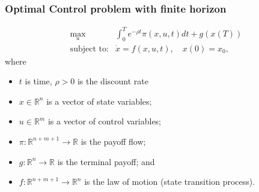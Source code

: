 \documentclass[bigger,handout]{beamer}
\newenvironment{stepitemize}{\begin{itemize}[<+->]}{\end{itemize} }
\begin{document}
 
 
\begin{frame}%
 
\frametitle{Optimal Control problem with finite horizon}

\begin{equation*}
\begin{array}{rc}
\max_{u} & \int_{0}^{T}e^{-\rho t}\pi (x,u,t)dt+g(x(T)) \\ 
\text{subject to:} & \dot{x}=f(x,u,t),\quad x(0)=x_{0},%
\end{array}%
\end{equation*}%
where

\begin{stepitemize}
\item $t$ is time, $\rho >0$ is the discount rate

\item $x\in \mathbb{R}^{n}$ is a vector of state variables;

\item $u\in \mathbb{R}^{m}$ is a vector of control variables;

\item $\pi :\mathbb{R}^{n+m+1}\rightarrow \mathbb{R}$ is the payoff flow;

\item $g:\mathbb{R}^{n}\rightarrow \mathbb{R}$ is the terminal payoff; and

\item $f:\mathbb{R}^{n+m+1}\rightarrow \mathbb{R}^{n}$ is the law of motion 
\newline
(state transition process).
\end{stepitemize}

 
 
\end{frame}%
 
 
 
\end{document}
